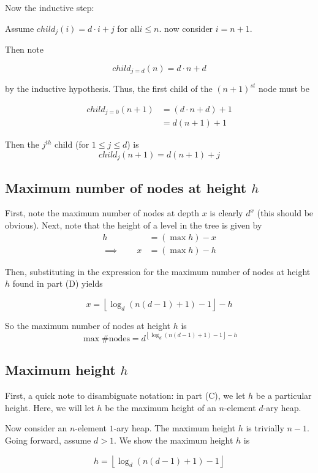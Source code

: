 \documentclass[paper=a4, fontsize=11pt]{scrartcl} %
\numberwithin{equation}{section} %
\numberwithin{figure}{section} %
\numberwithin{table}{section} %
\begin{document}
Now the inductive step:

Assume $child_j(i) = d\cdot i + j$ for all$ i \leq n$. now consider $i = n + 1$.

Then note

\[child_{j = d}(n) = d\cdot n + d\]

by the inductive hypothesis. Thus, the first child of the $(n + 1)^{st}$ node must be

\begin{align*}
child_{j = 0}(n + 1) &= (d\cdot n + d) + 1 \\
	&= d(n+1) + 1
\end{align*}

Then the $j^{th}$ child (for $1 \leq j \leq d$) is
\[child_j(n+1) = d(n+1)+j\]
 
\subsection{Maximum number of nodes at height $h$}

First, note the maximum number of nodes at depth $x$ is clearly $d^x$ (this should be obvious). Next, note that the height of a level in the tree is given by
\begin{align*}
h &= (\max h) - x \\
\implies \qquad{} x &= (\max h) - h
\end{align*}

Then, substituting in the expression for the maximum number of nodes at height $h$ found in part (D) yields

\[x = \left\lfloor \log_d(n(d-1) + 1) - 1 \right\rfloor - h\]

So the maximum number of nodes at height $h$ is
\[\max \textrm{\# nodes} = d^{ \left\lfloor \log_d(n(d-1) + 1) - 1 \right\rfloor - h}\]

\subsection{Maximum height $h$}

First, a quick note to disambiguate notation: in part (C), we let $h$ be a particular height. Here, we will let $h$ be the maximum height of an $n$-element $d$-ary heap.

Now consider an $n$-element $1$-ary heap. The maximum height $h$ is trivially $n - 1$. Going forward, assume $d > 1$. We show the maximum height $h$ is

\[h = \left\lfloor \log_d(n(d-1)+1) - 1 \right\rfloor\]
\end{document}
